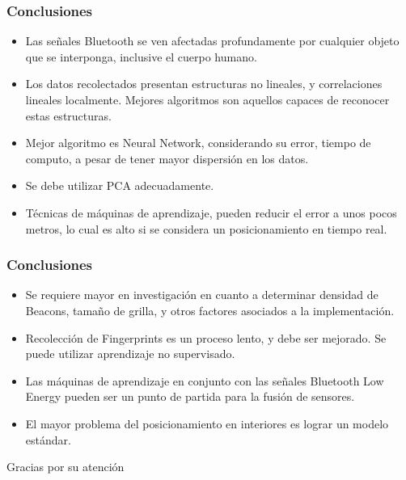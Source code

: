\documentclass[mathserif]{beamer}
\begin{document}
\begin{frame}
\frametitle{Conclusiones}

\begin{itemize}

\item Las señales Bluetooth se ven afectadas profundamente por cualquier objeto que se interponga, inclusive el cuerpo humano.
\pause

\item Los datos recolectados presentan estructuras no lineales, y correlaciones lineales localmente. Mejores algoritmos son aquellos capaces de reconocer estas estructuras.
\pause

\item Mejor algoritmo es Neural Network, considerando su error, tiempo de computo, a pesar de tener mayor dispersión en los datos.

\pause

\item Se debe utilizar PCA adecuadamente.

\pause

\item Técnicas de máquinas de aprendizaje, pueden reducir el error a unos pocos metros, lo cual es alto si se considera un posicionamiento en tiempo real. 

\end{itemize}

\end{frame}

\begin{frame}
\frametitle{Conclusiones}

\begin{itemize}

\item Se requiere mayor en investigación en cuanto a determinar densidad de Beacons, tamaño de grilla, y otros factores asociados a la implementación.
\pause

\item Recolección de Fingerprints es un proceso lento, y debe ser mejorado. Se puede utilizar aprendizaje no supervisado.
\pause

\item Las máquinas de aprendizaje en conjunto con las señales Bluetooth Low Energy pueden ser un punto de partida para la fusión de sensores.

\pause
\item El mayor problema del posicionamiento en interiores es lograr un modelo estándar.

\end{itemize}

\end{frame}

\begin{frame}
\Huge{\centerline{Gracias por su atención}}
\end{frame}

\end{document}
